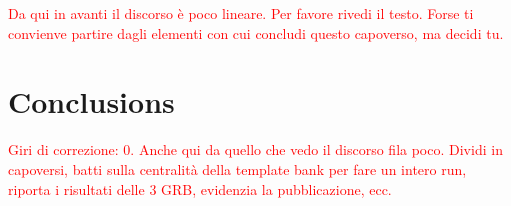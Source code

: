 \documentclass[binding=0.6cm, LaM]{sapthesis}
\newcommand{\fpg}[1]{\textcolor{red}{#1} }
\begin{document}
         \begin{figure}[t]
          \noindent
          \label{gated}
          \centering
          \caption{  }
          \label{fig:gated}
        \end{figure}


        \fpg{Da qui in avanti il discorso \`e poco lineare.  Per favore rivedi il testo.  Forse ti convienve partire dagli elementi con cui concludi questo capoverso, ma decidi tu.}

\chapter*{Conclusions}
\fpg{Giri di correzione: 0.}%
\fpg{Anche qui da quello che vedo il discorso fila poco.  Dividi in capoversi, batti sulla centralit\`a della template bank per fare un intero run, riporta i risultati delle 3 GRB, evidenzia la pubblicazione, ecc.}
\end{document}
